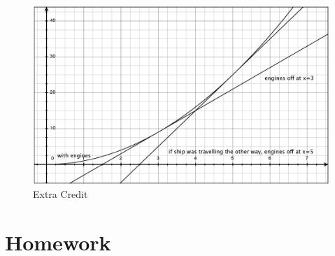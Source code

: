 \documentclass{exam}
\begin{document}
\begin{figure}[H]
  \centering
  \includegraphics[scale=.3]{extra_credit.eps}
  \caption*{Extra Credit}
\end{figure}

\pagebreak

\section{Homework}
\end{document}
